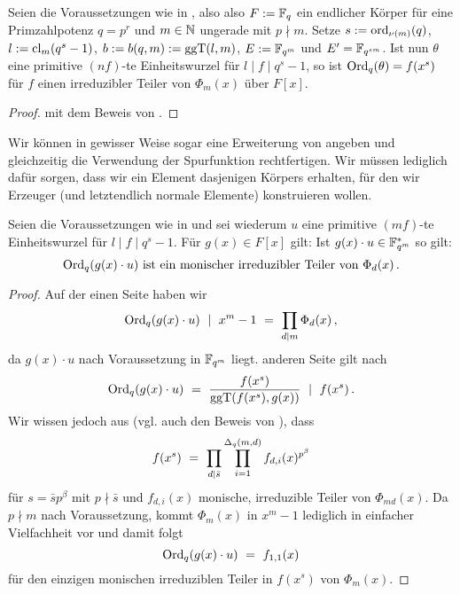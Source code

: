 \begin{lemma}
  \label{lemma:hoehere_wurzeln_auch_erzeuger_reg}
  Seien die Voraussetzungen wie in , also
  also $F := \mathbb{F}_q$ ein endlicher Körper für eine Primzahlpotenz $q = p^r$ 
  und $m\in\mathbb{N}$ ungerade mit $p\nmid m$.
  Setze $s := \operatorname{ord}_{\nu(m)}(q)$, 
  $l := \operatorname{cl}_m(q^s-1)$, $b:= b(q,m) := \operatorname{ggT}(l,m)$, $E := \mathbb{F}_{q^m}$ und
  $E' = \mathbb{F}_{q^{sm}}$. 
  Ist nun $\theta$ eine primitive $(nf)$-te Einheitswurzel für 
  $l \mid f \mid q^s-1$, so ist $\operatorname{Ord}_q(\theta) = f(x^s)$ für 
  $f$ einen irreduzibler Teiler von $\Phi_m(x)$ über $F[x]$.
\end{lemma}
\begin{proof}
   mit dem Beweis von
  .
\end{proof}


Wir können in gewisser Weise sogar eine Erweiterung von 
 angeben und
gleichzeitig die Verwendung der Spurfunktion rechtfertigen. 
Wir müssen lediglich dafür
sorgen, dass wir ein Element dasjenigen Körpers erhalten, 
für den wir Erzeuger (und letztendlich normale Elemente) konstruieren wollen.

\begin{satz}
  \label{satz:q_ordnung_von_zusammensetzen}
  Seien die Voraussetzungen wie in  und 
  sei wiederum $u$ eine primitive $(mf)$-te Einheitswurzel für
  $l\mid f \mid q^s-1$.
  Für $g(x) \in F[x]$ gilt:
  Ist $g(x)\cdot u \in \mathbb{F}_{q^m}^\ast$ so gilt:
  \[ \operatorname{Ord}_q(g(x)\cdot u) \text{ ist ein monischer irreduzibler Teiler von }
    \Phi_d(x)\,. \]
\end{satz}
\begin{proof}
  Auf der einen Seite haben wir 
  \[ \operatorname{Ord}_q(g(x)\cdot u) \ \mid\  x^m-1 \ =\  \prod_{d\mid m} \Phi_d(x)\,, \]
  da $g(x)\cdot u$ nach Voraussetzung in $\mathbb{F}_{q^m}$ liegt.
  anderen Seite gilt nach 
  \[ \operatorname{Ord}_q(g(x)\cdot u) \ =\  \frac{f(x^s)}{\operatorname{ggT}(f(x^s), g(x))} 
    \ \mid\  f(x^s) \,.\]
  Wir wissen jedoch aus  (vgl. auch den Beweis von
  ), dass 
  \[ f(x^s) \ =\  \prod_{d\mid \bar s} 
    \prod_{i=1}^{\Delta_q(m,d)} f_{d,i}(x)^{p^\beta}\]
  für $s = \bar sp^\beta$ mit $p\nmid \bar s$ und
  $f_{d,i}(x)$ monische, irreduzible Teiler von $\Phi_{md}(x)$. Da 
  $p\nmid m$ nach Voraussetzung, kommt $\Phi_m(x)$ in $x^m-1$ lediglich in
  einfacher Vielfachheit vor und damit folgt
  \[ \operatorname{Ord}_q(g(x)\cdot u) \ =\  f_{1,1}(x)\]
  für den einzigen monischen irreduziblen Teiler in $f(x^s)$ von $\Phi_m(x)$.
\end{proof}

